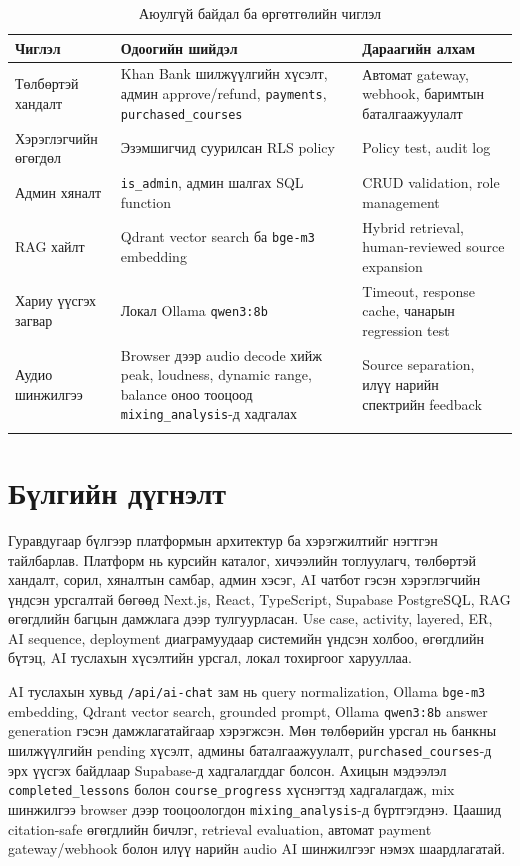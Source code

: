 \begin{longtable}{|p{}|p{}|p{}|}
  \hline
  \textbf{Чиглэл} & \textbf{Одоогийн шийдэл} & \textbf{Дараагийн алхам} \\ \hline
  Төлбөртэй хандалт & Khan Bank шилжүүлгийн хүсэлт, админ approve/refund, \texttt{payments}, \texttt{purchased\_courses} & Автомат gateway, webhook, баримтын баталгаажуулалт \\ \hline
  Хэрэглэгчийн өгөгдөл & Эзэмшигчид суурилсан RLS policy & Policy test, audit log \\ \hline
  Админ хяналт & \texttt{is\_admin}, админ шалгах SQL function & CRUD validation, role management \\ \hline
  RAG хайлт & Qdrant vector search ба \texttt{bge-m3} embedding & Hybrid retrieval, human-reviewed source expansion \cite{supabase_vectors,pgvector_github} \\ \hline
  Хариу үүсгэх загвар & Локал Ollama \texttt{qwen3:8b} & Timeout, response cache, чанарын regression test \\ \hline
  Аудио шинжилгээ & Browser дээр audio decode хийж peak, loudness, dynamic range, balance оноо тооцоод \texttt{mixing\_analysis}-д хадгалах & Source separation, илүү нарийн спектрийн feedback \\ \hline
  \caption{Аюулгүй байдал ба өргөтгөлийн чиглэл}
  \label{tab:ch3-security-scale}
\end{longtable}

\section*{Бүлгийн дүгнэлт}
Гуравдугаар бүлгээр платформын архитектур ба хэрэгжилтийг нэгтгэн тайлбарлав. Платформ нь курсийн каталог, хичээлийн тоглуулагч, төлбөртэй хандалт, сорил, хяналтын самбар, админ хэсэг, AI чатбот гэсэн хэрэглэгчийн үндсэн урсгалтай бөгөөд Next.js, React, TypeScript, Supabase PostgreSQL, RAG өгөгдлийн багцын дамжлага дээр тулгуурласан. Use case, activity, layered, ER, AI sequence, deployment диаграмуудаар системийн үндсэн холбоо, өгөгдлийн бүтэц, AI туслахын хүсэлтийн урсгал, локал тохиргоог харууллаа.

AI туслахын хувьд \texttt{/api/ai-chat} зам нь query normalization, Ollama \texttt{bge-m3} embedding, Qdrant vector search, grounded prompt, Ollama \texttt{qwen3:8b} answer generation гэсэн дамжлагатайгаар хэрэгжсэн. Мөн төлбөрийн урсгал нь банкны шилжүүлгийн pending хүсэлт, админы баталгаажуулалт, \texttt{purchased\_courses}-д эрх үүсгэх байдлаар Supabase-д хадгалагддаг болсон. Ахицын мэдээлэл \texttt{completed\_lessons} болон \texttt{course\_progress} хүснэгтэд хадгалагдаж, mix шинжилгээ browser дээр тооцоологдон \texttt{mixing\_analysis}-д бүртгэгдэнэ. Цаашид citation-safe өгөгдлийн бичлэг, retrieval evaluation, автомат payment gateway/webhook болон илүү нарийн audio AI шинжилгээг нэмэх шаардлагатай.

